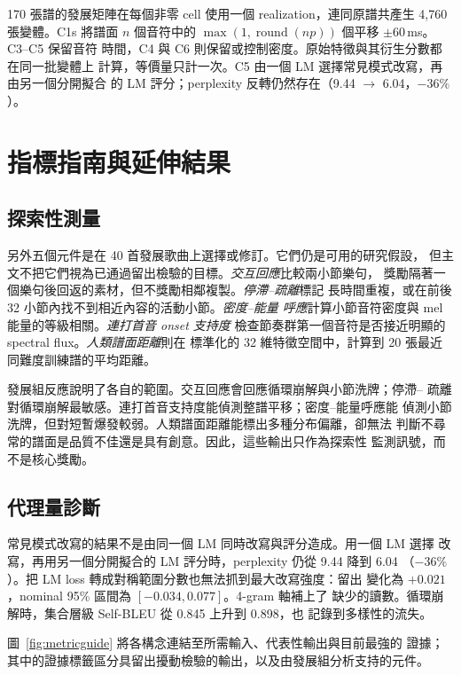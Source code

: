 \documentclass[10pt,twocolumn]{article}
\newcommand{\figref}[1]{圖~\ref{#1}}
\begin{document}
170 張譜的發展矩陣在每個非零 cell 使用一個 realization，連同原譜共產生
4{,}760 張變體。C1s 將譜面 $n$ 個音符中的
$\max(1,\operatorname{round}(np))$ 個平移 $\pm60$\,ms。C3--C5 保留音符
時間，C4 與 C6 則保留或控制密度。原始特徵與其衍生分數都在同一批變體上
計算，等價量只計一次。C5 由一個 LM 選擇常見模式改寫，再由另一個分開擬合
的 LM 評分；perplexity 反轉仍然存在（9.44 $\to$ 6.04，$-36\%$）。

\FloatBarrier

\section{指標指南與延伸結果}\label{app:visuals}

\subsection{探索性測量}

另外五個元件是在 40 首發展歌曲上選擇或修訂。它們仍是可用的研究假設，
但主文不把它們視為已通過留出檢驗的目標。\emph{交互回應}比較兩小節樂句，
獎勵隔著一個樂句後回返的素材，但不獎勵相鄰複製。\emph{停滯--疏離}標記
長時間重複，或在前後 32 小節內找不到相近內容的活動小節。\emph{密度--能量
呼應}計算小節音符密度與 mel 能量的等級相關。\emph{連打首音 onset 支持度}
檢查節奏群第一個音符是否接近明顯的 spectral flux。\emph{人類譜面距離}則在
標準化的 32 維特徵空間中，計算到 20 張最近同難度訓練譜的平均距離。

發展組反應說明了各自的範圍。交互回應會回應循環崩解與小節洗牌；停滯--
疏離對循環崩解最敏感。連打首音支持度能偵測整譜平移；密度--能量呼應能
偵測小節洗牌，但對短暫爆發較弱。人類譜面距離能標出多種分布偏離，卻無法
判斷不尋常的譜面是品質不佳還是具有創意。因此，這些輸出只作為探索性
監測訊號，而不是核心獎勵。

\subsection{代理量診斷}

常見模式改寫的結果不是由同一個 LM 同時改寫與評分造成。用一個 LM 選擇
改寫，再用另一個分開擬合的 LM 評分時，perplexity 仍從 9.44 降到 6.04
（$-36\%$）。把 LM loss 轉成對稱範圍分數也無法抓到最大改寫強度：留出
變化為 $+0.021$，nominal 95\% 區間為 $[-0.034,0.077]$。4-gram 軸補上了
缺少的讀數。循環崩解時，集合層級 Self-BLEU 從 0.845 上升到 0.898，也
記錄到多樣性的流失。

\figref{fig:metricguide} 將各構念連結至所需輸入、代表性輸出與目前最強的
證據；其中的證據標籤區分具留出擾動檢驗的輸出，以及由發展組分析支持的元件。
\end{document}
